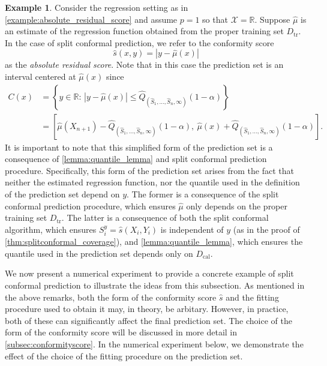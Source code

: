 \documentclass[11pt, titlepage]{article} %
\numberwithin{equation}{section}
\theoremstyle{definition}
\newtheorem{example}{Example}
\numberwithin{theorem}{section}
\numberwithin{lemma}{section}
\numberwithin{corollary}{section}
\numberwithin{proposition}{section}
\numberwithin{definition}{section}
\numberwithin{remark}{section}
\begin{document}
\begin{example}
Consider the regression setting as in \cref{example:absolute_residual_score} and assume \(p = 1\) so that \(\mathcal{X} = \mathbb{R}\). Suppose \(\hat{\mu}\) is an estimate of the regression function obtained from the proper training set \(D_\mathrm{tr}\). In the case of split conformal prediction, we refer to the conformity score \[\hat{s}(x,y) = |y - \hat{\mu}(x)|\] as the \textit{absolute residual score}. Note that in this case the prediction set is an interval centered at \(\hat{\mu}(x) \) since \begin{align}
    C(x) &= \left\{y \in \mathbb{R}: \, |y - \hat{\mu}(x) | \leq \hat{Q}_{(\hat{S}_1, \ldots, \hat{S}_n, \infty)}(1-\alpha) \right\} \nonumber \\
    &= \left[ \hat{\mu}(X_{n+1}) - \hat{Q}_{(\hat{S}_1, \ldots, \hat{S}_n, \infty)}(1-\alpha), \ \hat{\mu}(x) + \hat{Q}_{(\hat{S}_1, \ldots, \hat{S}_n, \infty)}(1-\alpha) \right] \label{eqn:split_absolute_residual_prediction_set}.
\end{align}
\noindent
It is important to note that this simplified form of the prediction set is a consequence of \cref{lemma:quantile_lemma} and split conformal prediction procedure. Specifically, this form of the prediction set arises from the fact that neither the estimated regression function, nor the quantile used in the definition of the prediction set depend on \(y\). The former is a consequence of the split conformal prediction procedure, which ensures \(\hat{\mu}\) only depends on the proper training set \(D_\mathrm{tr}\). The latter is a consequence of both the split conformal algorithm, which ensures \(S_i^y = \hat{s}(X_i, Y_i)\) is independent of \(y\) (as in the proof of \cref{thm:splitconformal_coverage}), and \cref{lemma:quantile_lemma}, which ensures the quantile used in the prediction set depends only on \(D_\mathrm{cal}\).
\label{example:splitCP_absolute_residual_score}
\end{example}

\noindent
We now present a numerical experiment to provide a concrete example of split conformal prediction to illustrate the ideas from this subsection. As mentioned in the above remarks, both the form of the conformity score \(\hat{s}\) and the fitting procedure used to obtain it may, in theory, be arbitary. However, in practice, both of these can significantly affect the final prediction set. The choice of the form of the conformity score will be discussed in more detail in \cref{subsec:conformityscore}. In the numerical experiment below, we demonstrate the effect of the choice of the fitting procedure on the prediction set. \vskip5pt
\end{document}
